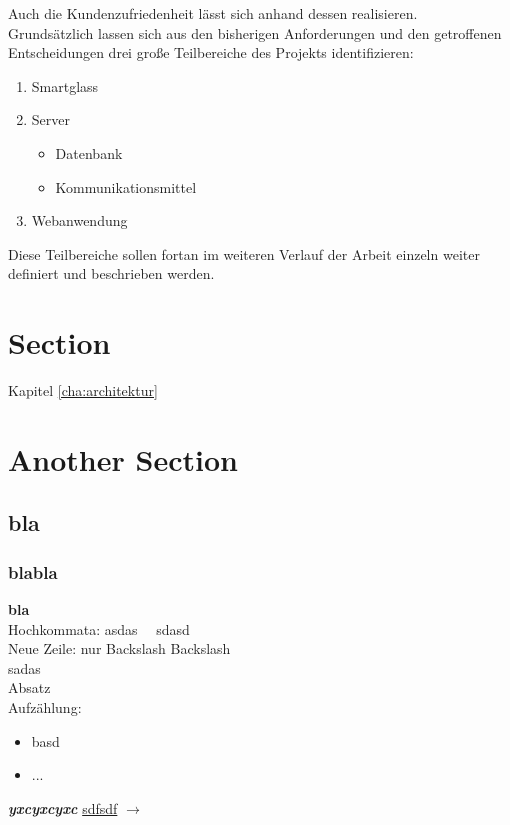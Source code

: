 Auch die Kundenzufriedenheit lässt sich anhand dessen realisieren. 
\\
Grundsätzlich lassen sich aus den bisherigen Anforderungen und den getroffenen Entscheidungen drei große Teilbereiche des Projekts identifizieren: 
\begin{enumerate}
	\item Smartglass
	\item Server
	\begin{itemize}
		\item Datenbank
		\item Kommunikationsmittel
	\end{itemize}
	\item Webanwendung
\end{enumerate}
Diese Teilbereiche sollen fortan im weiteren Verlauf der Arbeit einzeln weiter definiert und beschrieben werden.
\section{Section}
Kapitel \ref{cha:architektur}

\section{Another Section}
\subsection{bla}
\subsubsection{blabla}
\textbf{bla}\\
Hochkommata: \glqq asdas\grqq~~ sdasd\\

Neue Zeile: nur Backslash Backslash\\
sadas\\

Absatz\\

Aufzählung:
\begin{itemize}
	\item basd
	\item ...
\end{itemize}

\textit{\textbf{yxcyxcyxc}}
\underline{sdfsdf}
$\rightarrow$
